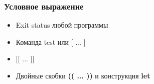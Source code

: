 \begin{frame}
    \frametitle{Условное выражение}
		\begin{itemize}
			\item Exit status любой программы
			\item Команда test или $[$ ... $]$
			\item $[[$ ... $]]$
			\item Двойные скобки {\bf (( ... ))} и конструкция {\bf let}
		\end{itemize}
\end{frame}

